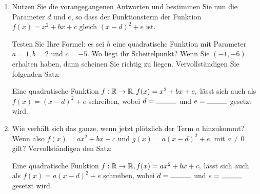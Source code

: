 \documentclass[12pt]{article}
\begin{document}
\begin{enumerate}[label=\alph*)]




\item Nutzen Sie die vorangegangenen Antworten und bestimmen Sie nun die Parameter $d$ und $e$, so dass der Funktionsterm der Funktion $f(x) = x^2 + bx + c$ gleich $(x-d)^2 + e$ ist.

Testen Sie Ihre Formel: es sei $h$ eine quadratische Funktion mit Parameter $a=1, b=2$ und $c=-5.$ Wo liegt ihr Scheitelpunkt? Wenn Sie $(-1, -6)$ erhalten haben, dann scheinen Sie richtig zu liegen. Vervollständigen Sie folgenden Satz:
\begin{whitebox}
Eine quadratische Funktion $f: \mathbb{R} \rightarrow \mathbb{R}, f(x) = x^2 + bx + c,$ lässt sich auch als $f(x) = (x-d)^2 + e$ schreiben, wobei $d= \rule{1cm}{0.5pt}$ und $e=\rule{1cm}{0.5pt}$ gesetzt wird.\end{whitebox}

\item Wie verhält sich das ganze, wenn jetzt plötzlich der Term $a$ hinzukommt? Wenn also $f(x) = ax^2 + bx + c$ und $g(x) = a(x-d)^2 + e$, mit $a\neq 0$ gilt? Vervollständigen den Satz:

\begin{whitebox}
Eine quadratische Funktion $f: \mathbb{R} \rightarrow \mathbb{R}, f(x) = ax^2 + bx + c,$ lässt sich auch als $f(x) = a(x-d)^2 + e$ schreiben, wobei $d= \rule{1cm}{0.5pt}$ und $e=\rule{1cm}{0.5pt}$ gesetzt wird.\end{whitebox}
\end{enumerate}


\end{document}
